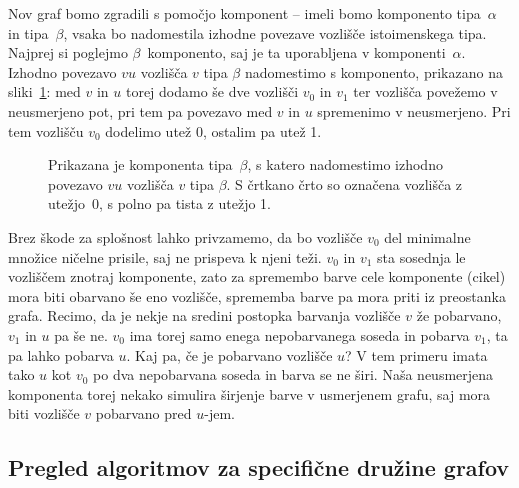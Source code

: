 \documentclass[12pt,a4paper,twoside]{article}
\theoremstyle{definition} %
\theoremstyle{plain} %
\numberwithin{equation}{section}  %
\begin{document}
Nov graf bomo zgradili s pomočjo komponent -- imeli bomo komponento tipa~$\alpha$ in tipa~$\beta$, vsaka bo nadomestila izhodne povezave vozlišče istoimenskega tipa. Najprej si poglejmo $\beta$~komponento, saj je ta uporabljena v komponenti~$\alpha$. Izhodno povezavo $vu$ vozlišča $v$ tipa $\beta$ nadomestimo s komponento, prikazano na sliki~\ref{fig:np-beta-komp}: med $v$ in $u$ torej dodamo še dve vozlišči $v_0$ in $v_1$ ter vozlišča povežemo v neusmerjeno pot, pri tem pa povezavo med $v$ in $u$ spremenimo v neusmerjeno. Pri tem vozlišču $v_0$ dodelimo utež 0, ostalim pa utež 1. 
\begin{figure}[h]
    \centering

    \caption{Prikazana je komponenta tipa~$\beta$, s katero nadomestimo izhodno povezavo $vu$ vozlišča $v$ tipa $\beta$. S črtkano črto so označena vozlišča z utežjo~0, s polno pa tista z utežjo 1.}
    \label{fig:np-beta-komp}
\end{figure}

Brez škode za splošnost lahko privzamemo, da bo vozlišče $v_0$ del minimalne množice ničelne prisile, saj ne prispeva k njeni teži. $v_0$ in $v_1$ sta sosednja le vozliščem znotraj komponente, zato za spremembo barve cele komponente (cikel) mora biti obarvano še eno vozlišče, sprememba barve pa mora priti iz preostanka grafa. Recimo, da je nekje na sredini postopka barvanja vozlišče $v$ že pobarvano, $v_1$ in $u$ pa še ne. $v_0$ ima torej samo enega nepobarvanega soseda in pobarva $v_1$, ta pa lahko pobarva $u$. Kaj pa, če je pobarvano vozlišče $u$? V tem primeru imata tako $u$ kot $v_0$ po dva nepobarvana soseda in barva se ne širi. Naša neusmerjena komponenta torej nekako simulira širjenje barve v usmerjenem grafu, saj mora biti vozlišče $v$ pobarvano pred $u$-jem.

\subsection{Pregled algoritmov za specifične družine grafov}
\end{document}
